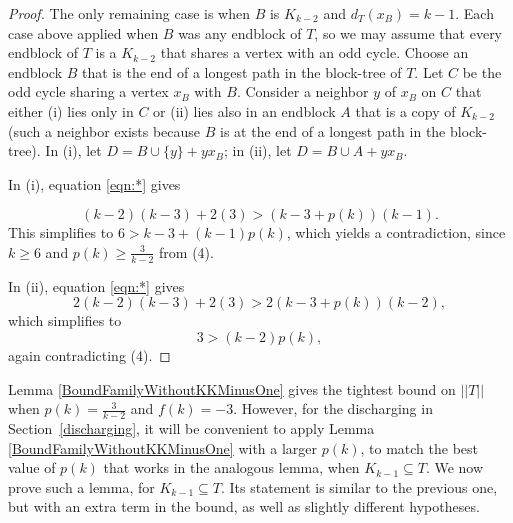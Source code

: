 \documentclass[12pt]{article}
\theoremstyle{plain}
\theoremstyle{definition}
\theoremstyle{remark}
\newcommand{\card}[1]{\left|#1\right|}
\newcommand{\size}[1]{\left\Vert#1\right\Vert}
\begin{document}
\begin{proof}
The only remaining case is when $B$ is $K_{k-2}$ and $d_T(x_B) =
k - 1$.  Each case above applied when $B$ was any endblock of $T$, so we may
assume that every endblock of $T$ is a $K_{k-2}$ that shares a vertex with an
odd cycle.  Choose an endblock $B$ that is the end of a longest path in the
block-tree of $T$.  Let $C$ be the odd cycle sharing a vertex $x_B$ with $B$. 
Consider a neighbor $y$ of $x_B$ on $C$ that either (i) lies only in $C$
or (ii) lies also in an endblock $A$ that is a copy of $K_{k-2}$ (such a
neighbor exists because $B$ is at the end of a longest path in the block-tree).
In (i), let $D=B\cup\{y\}+yx_B$; in (ii), let $D=B\cup A+yx_B$.

In (i), equation \eqref{eqn:*} gives

\[(k-2)(k-3)+2(3) > (k-3+p(k))(k-1).\]
%
This simplifies to $6>k-3+(k-1)p(k)$, which yields a contradiction, since $k\ge
6$ and $p(k)\ge \frac3{k-2}$ from (4).

In (ii), equation \eqref{eqn:*} gives
	\[2(k-2)(k-3) + 2(3) > 2(k-3 + p(k))(k-2),\]
	which simplifies to
	\[3 > (k-2)p(k),\]
	again contradicting (4).
\end{proof}

Lemma \ref{BoundFamilyWithoutKKMinusOne} gives the tightest bound on $||T||$ when $p(k) = \frac{3}{k-2}$ and $f(k) = -3$.   However, for the discharging in Section~\ref{discharging}, it will be convenient to apply Lemma \ref{BoundFamilyWithoutKKMinusOne} with a larger $p(k)$, to match the best value of $p(k)$ that works in the analogous lemma, when $K_{k-1}\subseteq T$.  We now prove such a lemma, for $K_{k-1}\subseteq T$.  Its statement is similar to the previous one, but with an extra term in the bound, as well as slightly different hypotheses.
\end{document}
